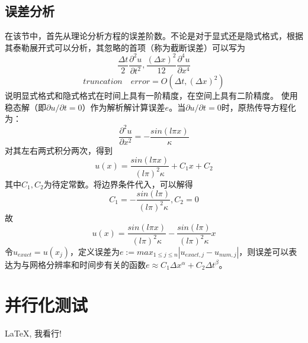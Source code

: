 \documentclass{article}
\begin{document}
		\subsection{误差分析}
		在该节中，首先从理论分析方程的误差阶数。不论是对于显式还是隐式格式，根据其泰勒展开式可以分析，其忽略的首项（称为截断误差）可以写为
		$$
		\frac{\Delta t}{2}\frac{\partial ^2u}{\partial t^2},\frac{(\Delta x)^2}{12}\frac{\partial ^4u}{\partial x^4}
		$$
		$$
		truncation \quad error=O(\Delta t,(\Delta x)^2)
		$$
		说明显式格式和隐式格式在时间上具有一阶精度，在空间上具有二阶精度。
		使用稳态解（即$\partial u /\partial t =0$）作为解析解计算误差$e$。当$\partial u /\partial t =0$时，原热传导方程化为：
		$$
		\frac{\partial^2 u}{\partial x^2}=-\frac{sin(l\pi x)}{\kappa}
		$$
		对其左右两式积分两次，得到
		$$
		u(x)=\frac{sin(l\pi x)}{(l\pi)^2\kappa}+C_1x+C_2
		$$
		其中$C_1,C_2$为待定常数。将边界条件代入，可以解得
		$$
		C_1=-\frac{sin(l\pi)}{(l\pi)^2\kappa},C_2=0
		$$
		故
		$$
		u(x)=\frac{sin(l\pi x)}{(l\pi)^2\kappa}-\frac{sin(l\pi)}{(l\pi)^2\kappa}x
		$$
		令$u_{exact}=u(x_j)$，定义误差为$e:=max_{1\leq j \leq n}|u_{exact,j}-u_{num,j}|$，则误差可以表达为与网格分辨率和时间步有关的函数$e \approx C_1\Delta x^{\alpha}+C_2\Delta t^{\beta}$。
		
		\clearpage
		
		\section{并行化测试}
		
		LaTeX, 我看行!
		
\end{document}
